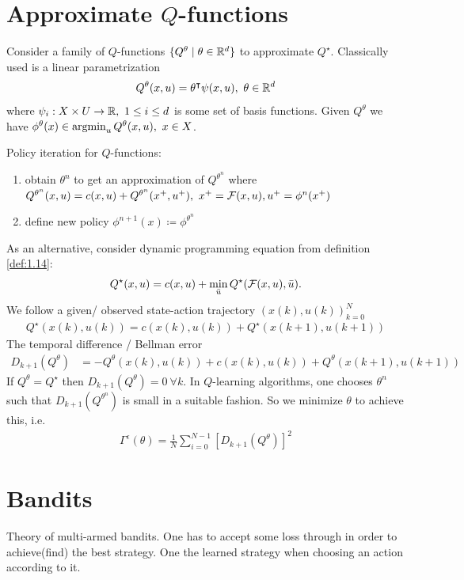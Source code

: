 \section{Approximate \(Q\)-functions}
Consider a family of \(Q\)-functions \(\{Q^\theta\mid \theta\in \mathbb{R}^d\}\)
to approximate \(Q^\star\). Classically used is a linear 
parametrization 
\[Q^\theta(x,u)=\theta^\intercal \psi(x,u),\  \theta\in\mathbb{R}^d\]  
where \(\psi_i:X\times U\to\mathbb{R},\ 1\leq i\leq d\) is some set of 
basis functions. 
Given \(Q^\theta\) we have \(\phi^\theta(x)\in\operatorname*{\text{argmin}}_{u}Q^\theta(x,u),\ x\in X\).

Policy iteration for \(Q\)-functions:
\begin{enumerate}
    \item obtain \(\theta^n\) to get an approximation of \(Q^{\theta^n}\)
          where \(Q^{\theta^n}(x,u)=c(x,u)+Q^{\theta^n}(x^+,u^+),\ x^+=\cF(x,u),u^+=\phi^n(x^+)\)
    \item define new policy \(\phi^{n+1}(x)\coloneqq \phi^{\theta^n}\) 
\end{enumerate}

As an alternative, consider dynamic programming equation from definition \ref{def:1.14}:
\begin{align*}
    Q^\star(x,u)=c(x,u)+\min_{\bar{u}}Q^\star(\mathcal{F}(x,u),\bar{u}).
\end{align*}
We follow a given/ observed state-action trajectory \((x(k),u(k))_{k=0}^N\)
\begin{align*}
    Q^\star(x(k),u(k))=c(x(k),u(k))+Q^\star(x(k+1),u(k+1))
\end{align*}
The temporal difference / Bellman error 
\begin{align*}
    D_{k+1}(Q^\theta)&=-Q^\theta(x(k),u(k))+c(x(k),u(k))+Q^\theta(x(k+1),u(k+1))
\end{align*} 
If \(Q^\theta=Q^\star\) then \(D_{k+1}(Q^\theta)=0\ \forall k\). In \(Q\)-learning 
algorithms, one chooses \(\theta^n\) such that \(D_{k+1}(Q^{\theta^n})\)
is small in a suitable fashion. So we minimize \(\theta\) to achieve this, i.e. 
\begin{align*}
    \Gamma^\epsilon(\theta)=\frac{1}{N}\sum_{i=0}^{N-1}[D_{k+1}(Q^\theta)]^2
\end{align*} 

\section{Bandits}
Theory of multi-armed bandits. One has to accept some 
loss through  in order to achieve(find) the best strategy.
One  the learned strategy when choosing an action according to it.

